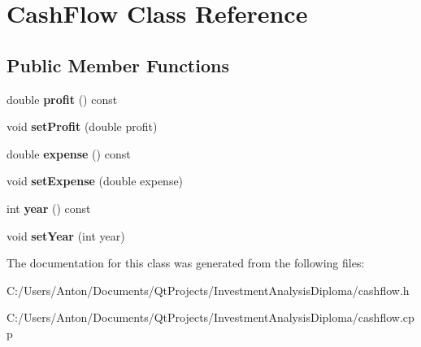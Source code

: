 \hypertarget{class_cash_flow}{}\section{Cash\+Flow Class Reference}
\label{class_cash_flow}
\subsection*{Public Member Functions}
\begin{DoxyCompactItemize}
\item 
\hypertarget{class_cash_flow_a763513884417f8495925752b02a8c77a}{}double {\bfseries profit} () const \label{class_cash_flow_a763513884417f8495925752b02a8c77a}

\item 
\hypertarget{class_cash_flow_adf551f6d27865350608dcef7e2d8ccca}{}void {\bfseries set\+Profit} (double profit)\label{class_cash_flow_adf551f6d27865350608dcef7e2d8ccca}

\item 
\hypertarget{class_cash_flow_a53f108f0ccbffc449eb6a457cb57b637}{}double {\bfseries expense} () const \label{class_cash_flow_a53f108f0ccbffc449eb6a457cb57b637}

\item 
\hypertarget{class_cash_flow_aae85ccdf2e3663c2aaa581df8b1c4f9c}{}void {\bfseries set\+Expense} (double expense)\label{class_cash_flow_aae85ccdf2e3663c2aaa581df8b1c4f9c}

\item 
\hypertarget{class_cash_flow_a42eb3f91615e8676b90b50d8c75c13de}{}int {\bfseries year} () const \label{class_cash_flow_a42eb3f91615e8676b90b50d8c75c13de}

\item 
\hypertarget{class_cash_flow_af21bc111a3a89624a9989723b291da5b}{}void {\bfseries set\+Year} (int year)\label{class_cash_flow_af21bc111a3a89624a9989723b291da5b}

\end{DoxyCompactItemize}


The documentation for this class was generated from the following files\+:\begin{DoxyCompactItemize}
\item 
C\+:/\+Users/\+Anton/\+Documents/\+Qt\+Projects/\+Investment\+Analysis\+Diploma/cashflow.\+h\item 
C\+:/\+Users/\+Anton/\+Documents/\+Qt\+Projects/\+Investment\+Analysis\+Diploma/cashflow.\+cpp\end{DoxyCompactItemize}
